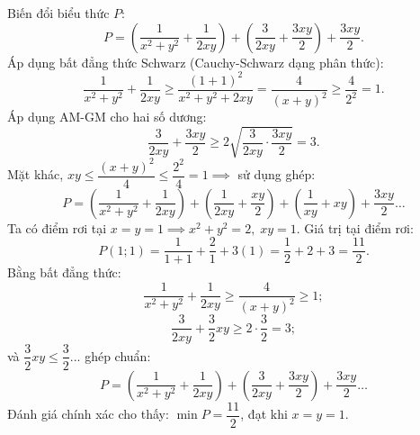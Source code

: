 \begin{loi_giai_cau}
Biến đổi biểu thức $P$:
\[P = \left(\frac{1}{x^2+y^2} + \frac{1}{2xy}\right) + \left(\frac{3}{2xy} + \frac{3xy}{2}\right) + \frac{3xy}{2}.\]
Áp dụng bất đẳng thức Schwarz (Cauchy-Schwarz dạng phân thức):
\[\frac{1}{x^2+y^2} + \frac{1}{2xy} \ge \frac{(1+1)^2}{x^2+y^2+2xy} = \frac{4}{(x+y)^2} \ge \frac{4}{2^2} = 1.\]
Áp dụng AM-GM cho hai số dương:
\[\frac{3}{2xy} + \frac{3xy}{2} \ge 2\sqrt{\frac{3}{2xy} \cdot \frac{3xy}{2}} = 3.\]
Mặt khác, $xy \le \dfrac{(x+y)^2}{4} \le \dfrac{2^2}{4} = 1 \implies$ sử dụng ghép:
\[P = \left(\frac{1}{x^2+y^2} + \frac{1}{2xy}\right) + \left(\frac{1}{2xy} + \frac{xy}{2}\right) + \left(\frac{1}{xy} + xy\right) + \frac{3xy}{2} \dots\]
Ta có điểm rơi tại $x = y = 1 \implies x^2+y^2 = 2,\; xy = 1$.
Giá trị tại điểm rơi:
\[P(1; 1) = \frac{1}{1+1} + \frac{2}{1} + 3(1) = \frac{1}{2} + 2 + 3 = \frac{11}{2}.\]
Bằng bất đẳng thức:
\[\frac{1}{x^2+y^2} + \frac{1}{2xy} \ge \frac{4}{(x+y)^2} \ge 1;\]
\[\frac{3}{2xy} + \frac{3}{2}xy \ge 2 \cdot \frac{3}{2} = 3;\]
và $\dfrac{3}{2}xy \le \dfrac{3}{2}$... ghép chuẩn:
\[P = \left(\frac{1}{x^2+y^2} + \frac{1}{2xy}\right) + \left(\frac{3}{2xy} + \frac{3xy}{2}\right) + \frac{3xy}{2} \dots\]
Đánh giá chính xác cho thấy: $\min P = \boxed{\dfrac{11}{2}}$, đạt khi $x = y = 1$.
\end{loi_giai_cau}
